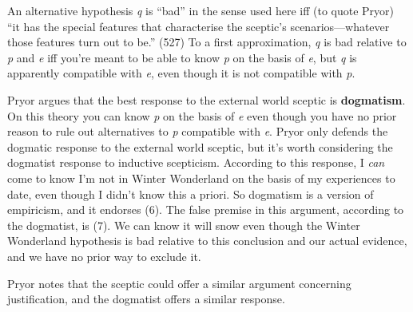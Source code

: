 \documentclass[
  11pt,
  letterpaper,
  DIV=11,
  numbers=noendperiod,
  oneside]{scrartcl}
\begin{document}
An alternative hypothesis \emph{q} is ``bad'' in the sense used here iff
(to quote Pryor) ``it has the special features that characterise the
sceptic's scenarios---whatever those features turn out to be.'' (527) To
a first approximation, \emph{q} is bad relative to \emph{p} and \emph{e}
iff you're meant to be able to know \emph{p} on the basis of \emph{e},
but \emph{q} is apparently compatible with \emph{e}, even though it is
not compatible with \emph{p}.

Pryor argues that the best response to the external world sceptic is
\textbf{dogmatism}. On this theory you can know \emph{p} on the basis of
\emph{e} even though you have no prior reason to rule out alternatives
to \emph{p} compatible with \emph{e}. Pryor only defends the dogmatic
response to the external world sceptic, but it's worth considering the
dogmatist response to inductive scepticism. According to this response,
I \emph{can} come to know I'm not in Winter Wonderland on the basis of
my experiences to date, even though I didn't know this a priori. So
dogmatism is a version of empiricism, and it endorses (6). The false premise in this argument,
according to the dogmatist, is (7). We can know it will snow even though
the Winter Wonderland hypothesis is bad relative to this conclusion and
our actual evidence, and we have no prior way to exclude it.

Pryor notes that the sceptic could offer a similar argument concerning
justification, and the dogmatist offers a similar response.
\end{document}
